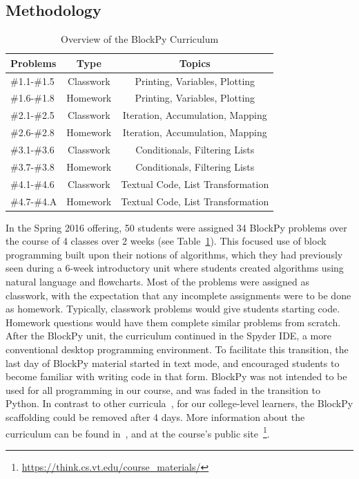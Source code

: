 \documentclass[10pt,journal,compsoc]{IEEEtran}
\begin{document}
\subsection{Methodology}

\begin{table}[!h]
\renewcommand{\arraystretch}{1.3}
\caption{Overview of the BlockPy Curriculum}
\label{table:blockpy-curriculum}
\centering
\begin{tabular}{l|c|c}

Problems & Type & Topics \\\hline
\#1.1-\#1.5 & Classwork & Printing, Variables, Plotting\\\hline
\#1.6-\#1.8 & Homework & Printing, Variables, Plotting\\\hline
\#2.1-\#2.5 & Classwork & Iteration, Accumulation, Mapping\\\hline
\#2.6-\#2.8 & Homework & Iteration, Accumulation, Mapping\\\hline
\#3.1-\#3.6 & Classwork & Conditionals, Filtering Lists\\\hline
\#3.7-\#3.8 & Homework & Conditionals, Filtering Lists\\\hline
\#4.1-\#4.6 & Classwork & Textual Code, List Transformation\\\hline
\#4.7-\#4.A & Homework & Textual Code, List Transformation\\\hline
\end{tabular}
\end{table}

In the Spring 2016 offering, 50 students were assigned 34 BlockPy problems over the course of 4 classes over 2 weeks (see Table~\ref{table:blockpy-curriculum}).
This focused use of block programming built upon their notions of algorithms, which they had previously seen during a 6-week introductory unit where students created algorithms using natural language and flowcharts.
Most of the problems were assigned as classwork, with the expectation that any incomplete assignments were to be done as homework.
Typically, classwork problems would give students starting code.
Homework questions would have them complete similar problems from scratch.
After the BlockPy unit, the curriculum continued in the Spyder IDE, a more conventional desktop programming environment.
To facilitate this transition, the last day of BlockPy material started in text mode, and encouraged students to become familiar with writing code in that form.
BlockPy was not intended to be used for all programming in our course, and was faded in the transition to Python.
In contrast to other curricula~\cite{mediated-alice}, for our college-level learners, the BlockPy scaffolding could be removed after 4 days.
More information about the curriculum can be found in~\cite{kafura2015design}, and at the course's public site~\footnote{\url{https://think.cs.vt.edu/course_materials/}}.
\end{document}
